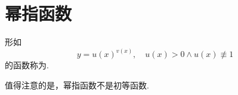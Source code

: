 \section{幂指函数}
\begin{definition}
形如\begin{equation*}
	y = u(x)^{v(x)},
	\quad u(x) > 0 \land u(x) \not\equiv 1
\end{equation*}的函数称为.
\end{definition}
值得注意的是，幂指函数不是初等函数.
